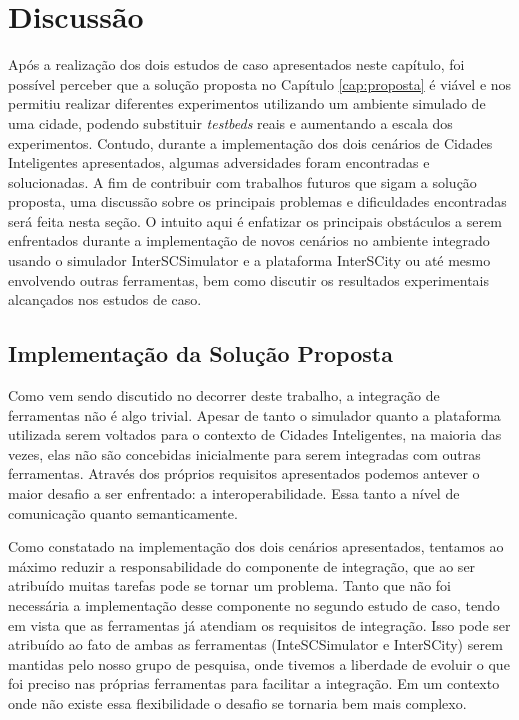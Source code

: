 \section{Discussão}


Após a realização dos dois estudos de caso apresentados neste capítulo, foi possível perceber que a solução proposta no Capítulo \ref{cap:proposta} é viável e nos permitiu realizar
diferentes experimentos utilizando um ambiente simulado de uma cidade, podendo substituir \textit{testbeds} reais e aumentando a escala dos experimentos.
Contudo, durante a implementação dos dois cenários de Cidades Inteligentes apresentados, algumas adversidades foram encontradas e solucionadas.
A fim de contribuir com trabalhos futuros que sigam a solução proposta, uma discussão sobre os principais problemas e dificuldades encontradas será feita
nesta seção.
O intuito aqui é enfatizar os principais obstáculos a serem enfrentados durante a implementação de novos cenários no ambiente integrado usando o simulador InterSCSimulator e
a plataforma InterSCity ou até mesmo envolvendo outras ferramentas, bem como discutir os resultados experimentais alcançados nos estudos de caso.


\subsection{Implementação da Solução Proposta}

Como vem sendo discutido no decorrer deste trabalho, a integração de ferramentas não é algo trivial.
Apesar de tanto o simulador quanto a plataforma utilizada serem voltados para o contexto de Cidades Inteligentes, na maioria das vezes, elas não são concebidas inicialmente
para serem integradas com outras ferramentas.
Através dos próprios requisitos apresentados podemos antever o maior desafio a ser enfrentado: a interoperabilidade.
Essa tanto a nível de comunicação quanto semanticamente.

Como constatado na implementação dos dois cenários apresentados, tentamos ao máximo reduzir a responsabilidade do componente de integração, que ao ser atribuído muitas
tarefas pode se tornar um problema.
Tanto que não foi necessária a implementação desse componente no segundo estudo de caso, tendo em vista que as ferramentas já atendiam os requisitos de integração.
Isso pode ser atribuído ao fato de ambas as ferramentas (InteSCSimulator e InterSCity) serem mantidas pelo nosso grupo de pesquisa, onde tivemos a liberdade de evoluir o
que foi preciso nas próprias ferramentas para facilitar a integração.
Em um contexto onde não existe essa flexibilidade o desafio se tornaria bem mais complexo.

